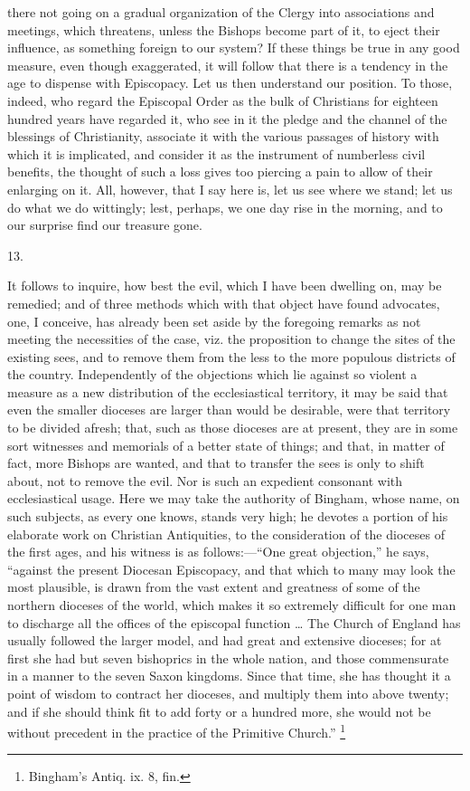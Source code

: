 there not going on a gradual organization of the Clergy into
associations and meetings, which threatens, unless the Bishops become
part of it, to eject their influence, as something foreign to our
system? If these things be true in any good measure, even though exaggerated, it will follow that there is a tendency in the age to
dispense with Episcopacy. Let us then understand our position. To
those, indeed, who regard the Episcopal Order as the bulk of
Christians for eighteen hundred years have regarded it, who see in it
the pledge and the channel of the blessings of Christianity, associate
it with the various passages of history with which it is implicated,
and consider it as the instrument of numberless civil benefits, the
thought of such a loss gives too piercing a pain to allow of their
enlarging on it. All, however, that I say here is, let us see where we
stand; let us do what we do wittingly; lest, perhaps, we one day rise
in the morning, and to our surprise find our treasure gone.

13.

It follows to inquire, how best the evil, which I
have been dwelling on, may be remedied; and of three methods which
with that object have found advocates, one, I conceive, has already
been set aside by the foregoing remarks as not meeting the necessities
of the case, viz. the proposition to change the sites of the existing
sees, and to remove them from the less to the more populous districts
of the country. Independently of the objections which lie against so
violent a measure as a new distribution of the ecclesiastical
territory, it may be said that even the smaller dioceses are larger
than would be desirable, were that territory to be divided afresh;
that, such as those dioceses are at present, they are in some sort
witnesses and memorials of a better state of things; and that, in
matter of fact, more Bishops are wanted, and that to transfer the sees
is only to shift about, not to remove the evil. Nor is such an
expedient consonant with ecclesiastical usage. Here we may take the
authority of Bingham, whose name, on such subjects, as every one
knows, stands very high; he devotes a portion of his elaborate work on
Christian Antiquities, to the consideration of the dioceses of
the first ages, and his witness is as follows:—``One great objection,''
he says, ``against the present Diocesan Episcopacy, and that which to
many may look the most plausible, is drawn from the vast extent and
greatness of some of the northern dioceses of the world, which makes
it so extremely difficult for one man to discharge all the offices of
the episcopal function … The Church of England has usually followed
the larger model, and had great and extensive dioceses; for at first
she had but seven bishoprics in the whole nation, and those
commensurate in a manner to the seven Saxon kingdoms. Since that time,
she has thought it a point of wisdom to contract her dioceses, and
multiply them into above twenty; and if she should think fit to add
forty or a hundred more, she would not be without precedent in the
practice of the Primitive Church.'' \footnote{Bingham's Antiq. ix. 8, fin.}

